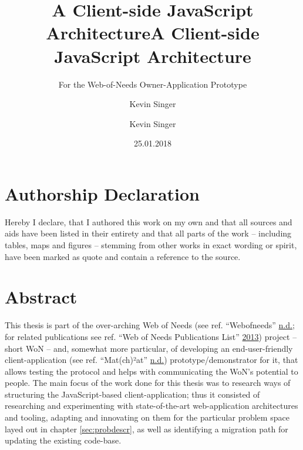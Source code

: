 \documentclass[a4paper,,tablecaptionabove]{scrbook}
\title{A Client-side JavaScript Architecture}
\subtitle{For the Web-of-Needs Owner-Application Prototype}
\author{Kevin Singer}
\date{25.01.2018}
\title{A Client-side JavaScript Architecture}
\author{Kevin Singer}
\begin{document}

\begin{titlepage}
\afterpage{\restorepagecolor}
\newcommand{\colorRule}[3][black]{\textcolor[HTML]{#1}{\rule{#2}{#3}}}
\end{titlepage}
\restoregeometry



{
\setcounter{tocdepth}{2}
\tableofcontents
}
\listoftables
\listoffigures
\lstlistoflistings

\hypertarget{authorship-declaration}{%
\chapter{Authorship Declaration}\label{authorship-declaration}}

Hereby I declare, that I authored this work on my own and that all
sources and aids have been listed in their entirety and that all parts
of the work -- including tables, maps and figures -- stemming from other
works in exact wording or spirit, have been marked as quote and contain
a reference to the source.

\hypertarget{sec:abstract}{%
\chapter{Abstract}\label{sec:abstract}}

This thesis is part of the over-arching Web of Needs (see ref.
``Webofneeds'' \protect\hyperlink{ref-Webofneeds}{n.d.}; for related
publications see ref. ``Web of Needs Publications List''
\protect\hyperlink{ref-WebNeedsPublications2013}{2013}) project -- short
WoN -- and, somewhat more particular, of developing an end-user-friendly
client-application (see ref. ``Mat(ch)²at''
\protect\hyperlink{ref-Match}{n.d.}) prototype/demonstrator for it, that
allows testing the protocol and helps with communicating the WoN's
potential to people. The main focus of the work done for this thesis was
to research ways of structuring the JavaScript-based client-application;
thus it consisted of researching and experimenting with state-of-the-art
web-application architectures and tooling, adapting and innovating on
them for the particular problem space layed out in chapter
\ref{sec:probdescr}, as well as identifying a migration path for
updating the existing code-base.
\end{document}
